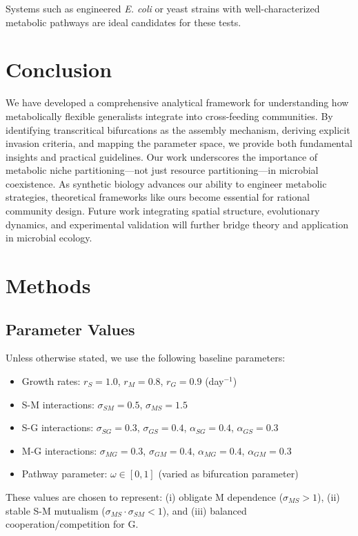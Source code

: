 \documentclass[11pt]{article}
\begin{document}
Systems such as engineered \textit{E. coli} or yeast strains with well-characterized metabolic pathways \cite{wintermute2010dynamics,mee2014syntrophic} are ideal candidates for these tests.

\section{Conclusion}

We have developed a comprehensive analytical framework for understanding how metabolically flexible generalists integrate into cross-feeding communities. By identifying transcritical bifurcations as the assembly mechanism, deriving explicit invasion criteria, and mapping the parameter space, we provide both fundamental insights and practical guidelines. Our work underscores the importance of metabolic niche partitioning—not just resource partitioning—in microbial coexistence. As synthetic biology advances our ability to engineer metabolic strategies, theoretical frameworks like ours become essential for rational community design. Future work integrating spatial structure, evolutionary dynamics, and experimental validation will further bridge theory and application in microbial ecology.

\section*{Methods}

\subsection{Parameter Values}

Unless otherwise stated, we use the following baseline parameters:
\begin{itemize}
\item Growth rates: $r_S = 1.0$, $r_M = 0.8$, $r_G = 0.9$ (day$^{-1}$)
\item S-M interactions: $\sigma_{SM} = 0.5$, $\sigma_{MS} = 1.5$
\item S-G interactions: $\sigma_{SG} = 0.3$, $\sigma_{GS} = 0.4$, $\alpha_{SG} = 0.4$, $\alpha_{GS} = 0.3$
\item M-G interactions: $\sigma_{MG} = 0.3$, $\sigma_{GM} = 0.4$, $\alpha_{MG} = 0.4$, $\alpha_{GM} = 0.3$
\item Pathway parameter: $\omega \in [0, 1]$ (varied as bifurcation parameter)
\end{itemize}

These values are chosen to represent: (i) obligate M dependence ($\sigma_{MS} > 1$), (ii) stable S-M mutualism ($\sigma_{MS}\cdot\sigma_{SM} < 1$), and (iii) balanced cooperation/competition for G.
\end{document}
